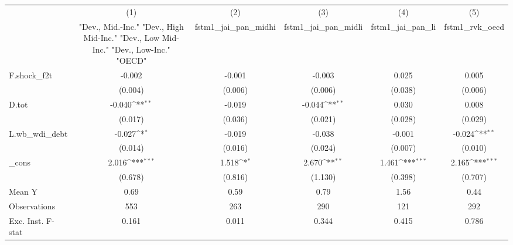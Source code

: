 {
\def\sym#1{\ifmmode^{#1}\else\(^{#1}\)\fi}
\begin{tabular}{l*{5}{c}}
\toprule
            &\multicolumn{1}{c}{(1)}&\multicolumn{1}{c}{(2)}&\multicolumn{1}{c}{(3)}&\multicolumn{1}{c}{(4)}&\multicolumn{1}{c}{(5)}\\
            &\multicolumn{1}{c}{ "Dev., Mid.-Inc." "Dev., High Mid-Inc." "Dev., Low Mid-Inc." "Dev., Low-Inc." "OECD" }&\multicolumn{1}{c}{fstm1\_jai\_pan\_midhi}&\multicolumn{1}{c}{fstm1\_jai\_pan\_midli}&\multicolumn{1}{c}{fstm1\_jai\_pan\_li}&\multicolumn{1}{c}{fstm1\_rvk\_oecd}\\
\midrule
F.shock\_f2t &      -0.002         &      -0.001         &      -0.003         &       0.025         &       0.005         \\
            &     (0.004)         &     (0.006)         &     (0.006)         &     (0.038)         &     (0.006)         \\
\addlinespace
D.tot       &      -0.040\sym{**} &      -0.019         &      -0.044\sym{**} &       0.030         &       0.008         \\
            &     (0.017)         &     (0.036)         &     (0.021)         &     (0.028)         &     (0.029)         \\
\addlinespace
L.wb\_wdi\_debt&      -0.027\sym{*}  &      -0.019         &      -0.038         &      -0.001         &      -0.024\sym{**} \\
            &     (0.014)         &     (0.016)         &     (0.024)         &     (0.007)         &     (0.010)         \\
\addlinespace
\_cons      &       2.016\sym{***}&       1.518\sym{*}  &       2.670\sym{**} &       1.461\sym{***}&       2.165\sym{***}\\
            &     (0.678)         &     (0.816)         &     (1.130)         &     (0.398)         &     (0.707)         \\
\midrule
Mean Y      &        0.69         &        0.59         &        0.79         &        1.56         &        0.44         \\
Observations&         553         &         263         &         290         &         121         &         292         \\
Exc. Inst. F-stat&       0.161         &       0.011         &       0.344         &       0.415         &       0.786         \\
\bottomrule
\end{tabular}
}
